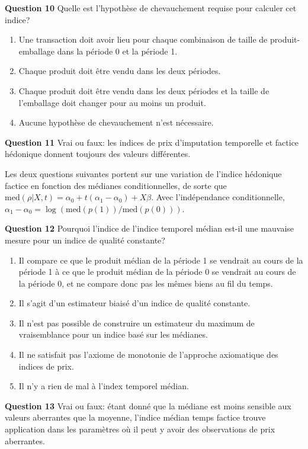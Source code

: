 \documentclass[]{article}
\begin{document}
\textbf{Question 10} Quelle est l'hypothèse de chevauchement requise pour calculer cet indice?

\begin{enumerate}
\def\labelenumi{\alph{enumi})}
\item
  Une transaction doit avoir lieu pour chaque combinaison de taille de produit-emballage dans la période 0 et la période 1.
\item
  Chaque produit doit être vendu dans les deux périodes.
\item
  Chaque produit doit être vendu dans les deux périodes et la taille de l'emballage doit changer pour au moins un produit.
\item
  Aucune hypothèse de chevauchement n'est nécessaire.
\end{enumerate}

\textbf{Question 11} Vrai ou faux: les indices de prix d'imputation temporelle et factice hédonique donnent toujours des valeurs différentes.

Les deux questions suivantes portent sur une variation de l'indice hédonique factice en fonction des médianes conditionnelles, de sorte que \(\text{med}(\rho | X, t) = \alpha_{0} + t (\alpha_{1} - \alpha_{0}) + X \beta\). Avec l'indépendance conditionnelle, \(\alpha_{1} - \alpha_{0} = \log(\text{med}(p(1)) / \text{med}(p(0)))\).

\textbf{Question 12} Pourquoi l'indice de l'indice temporel médian est-il une mauvaise mesure pour un indice de qualité constante?

\begin{enumerate}
\def\labelenumi{\alph{enumi})}
\item
  Il compare ce que le produit médian de la période 1 se vendrait au cours de la période 1 à ce que le produit médian de la période 0 se vendrait au cours de la période 0, et ne compare donc pas les mêmes biens au fil du temps.
\item
  Il s'agit d'un estimateur biaisé d'un indice de qualité constante.
\item
  Il n'est pas possible de construire un estimateur du maximum de vraisemblance pour un indice basé sur les médianes.
\item
  Il ne satisfait pas l'axiome de monotonie de l'approche axiomatique des indices de prix.
\item
  Il n'y a rien de mal à l'index temporel médian.
\end{enumerate}

\textbf{Question 13} Vrai ou faux: étant donné que la médiane est moins sensible aux valeurs aberrantes que la moyenne, l'indice médian temps factice trouve application dans les paramètres où il peut y avoir des observations de prix aberrantes.
\end{document}
